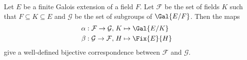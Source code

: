         

\begin{theorem}\label{thrm-fundamental-theorem-of-galois-theory}
    Let $E$ be a finite Galois extension of a field $F$. Let $\mathcal{F}$ be the set of fields $K$ such that $F \subseteq K \subseteq E$ and $\mathcal{G}$ be the set of subgroups of $\Gal{E/F}$. Then the maps
    \begin{align*}
        \alpha: \mathcal{F} \to \mathcal{G}, \;&K \mapsto \Gal{E/K}\\
        \beta: \mathcal{G} \to \mathcal{F}, \;&H \mapsto \Fix{E}{H}
    \end{align*}
    give a well-defined bijective correspondence between $\mathcal{F}$ and $\mathcal{G}$.
\end{theorem}
